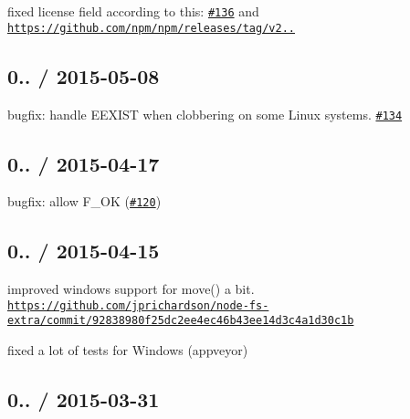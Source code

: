 \begin{DoxyItemize}
\item fixed license field according to this\+: \href{https://github.com/jprichardson/node-fs-extra/pull/136}{\tt \#136} and \href{https://github.com/npm/npm/releases/tag/v2.10.0}{\tt https\+://github.\+com/npm/npm/releases/tag/v2..}
\end{DoxyItemize}

\subsection*{0.. / 2015-\/05-\/08 }


\begin{DoxyItemize}
\item bugfix\+: handle {\ttfamily E\+E\+X\+I\+ST} when clobbering on some Linux systems. \href{https://github.com/jprichardson/node-fs-extra/pull/134}{\tt \#134}
\end{DoxyItemize}

\subsection*{0.. / 2015-\/04-\/17 }


\begin{DoxyItemize}
\item bugfix\+: allow {\ttfamily F\+\_\+\+OK} (\href{https://github.com/jprichardson/node-fs-extra/issues/120}{\tt \#120})
\end{DoxyItemize}

\subsection*{0.. / 2015-\/04-\/15 }


\begin{DoxyItemize}
\item improved windows support for {\ttfamily move()} a bit. \href{https://github.com/jprichardson/node-fs-extra/commit/92838980f25dc2ee4ec46b43ee14d3c4a1d30c1b}{\tt https\+://github.\+com/jprichardson/node-\/fs-\/extra/commit/92838980f25dc2ee4ec46b43ee14d3c4a1d30c1b}
\item fixed a lot of tests for Windows (appveyor)
\end{DoxyItemize}

\subsection*{0.. / 2015-\/03-\/31 }


